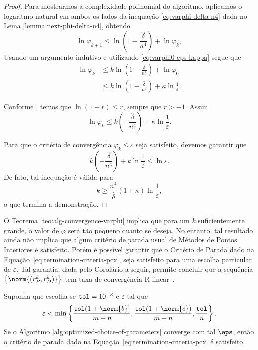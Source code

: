 \begin{proof} Para mostrarmos a complexidade polinomial do algoritmo, aplicamos o logaritmo natural em ambos os lados da inequação \eqref{eq:varphi-delta-n4} dada no Lema \ref{lemma:next-phi-delta-n4}, obtendo
	\[
	\ln\varphi_{k+1}\leq \ln \left(1 - \frac{\hat{\delta}}{n^{4}}\right) + \ln\varphi_{k},
	\]
Usando um argumento indutivo e utilizando \eqref{eq:varphi0-eps-kappa} segue que
\[
	\begin{aligned}
		\ln\varphi_{k} & \leq k \ln\left(1 - \frac{\hat{\delta}}{n^{4}}\right) + \ln \varphi_{0} \\
					& \leq k \ln\left(1 - \frac{\hat{\delta}}{n^{4}}\right) + \kappa\ln \frac{1}{\varepsilon}. 
	\end{aligned}
\] 

Conforme \textcite[Lema 4.1, p.~68]{Wright:Primal-dual-interior-point:1997h}, temos que $\ln(1+r) \leq r$, sempre que $r>-1$. Assim
\[
	\ln\varphi_{k}\leq k \left(- \frac{\hat{\delta}}{n^{4}}\right) + \kappa\ln \frac{1}{\varepsilon}.
\] 

Para que o critério de convergência $\varphi_{k}\leq\varepsilon$ seja satisfeito, devemos garantir que 
\[
	k \left(- \frac{\hat{\delta}}{n^{4}}\right) + \kappa\ln \frac{1}{\varepsilon} \leq \ln\varepsilon.
\] 
De fato, tal inequação é válida para 
\[
	k \geq \dfrac{n^{4}}{\hat{\delta}}(1+\kappa)\ln\frac{1}{\varepsilon},
\]
o que termina a demonstração.
\end{proof}






O Teorema \ref{teo:alg-convergence-varphi} implica que para um $k$ suficientemente grande, o valor de $\varphi$ será tão pequeno quanto se deseja. No entanto, tal resultado ainda não implica que algum critério de parada usual de Métodos de Pontos Interiores é satisfeito. Porém é possível garantir que o Critério de Parada dado na Equação~\eqref{eq:termination-criteria-pcx}, seja satisfeito para uma escolha particular de $\varepsilon$. Tal garantia, dada pelo Corolário a seguir, permite concluir que a sequência $\left\{\norm{(r_{P}^{k},r_{D}^{k})}\right\}$ tem taxa de convergência R-linear~\cite{Ortega:2000vd}.

\begin{corol}
Suponha que escolha-se  $\mathtt{tol} = \num{e-8}$  e $\varepsilon$   tal que 
\begin{equation}
	\label{eq:choosing-eps}
		\varepsilon < \min\left\{  \frac{\tol(1+\norm{b})}{m+n}, \frac{\tol(1+\norm{c})}{m+n},\frac{\tol}{n}\right\}.
\end{equation}
Se o Algoritmo \ref{alg:optimized-choice-of-parameters} converge com tal $\eps$, então o critério de parada dado na Equação~\eqref{eq:termination-criteria-pcx} é satisfeito.
\end{corol}		

